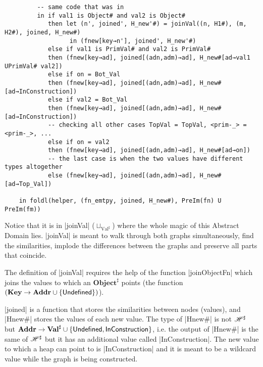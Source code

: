\begin{verbatim}
         -- same code that was in
         in if val1 is Object# and val2 is Object#
            then let (n', joined', H_new'#) = joinVal((n, H1#), (m, H2#), joined, H_new#)
                  in (fnew[key→n'], joined', H_new'#)
            else if val1 is PrimVal# and val2 is PrimVal#
            then (fnew[key→ad], joined[(adn,adm)→ad], H_new#[ad→val1 UPrimVal# val2])
            else if on = Bot_Val
            then (fnew[key→ad], joined[(adn,adm)→ad], H_new#[ad→InConstruction])
            else if val2 = Bot_Val
            then (fnew[key→ad], joined[(adn,adm)→ad], H_new#[ad→InConstruction])
            -- checking all other cases TopVal = TopVal, <prim-_> = <prim-_>, ...
            else if on = val2
            then (fnew[key→ad], joined[(adn,adm)→ad], H_new#[ad→on])
            -- the last case is when the two values have different types altogether
            else (fnew[key→ad], joined[(adn,adm)→ad], H_new#[ad→Top_Val])

    in foldl(helper, (fn_emtpy, joined, H_new#), PreIm(fn) U PreIm(fm))
\end{verbatim}


Notice that it is in \pycode|joinVal| (\(\sqcup_{\text{Val}^\sharp}\)) where the whole
magic of this Abstract Domain lies. \pycode|joinVal| is meant to walk through both graphs
simultaneously, find the similarities, implode the differences between the graphs and
preserve all parts that coincide.

The definition of \pycode|joinVal| requires the help of the function \pycode|joinObjectFn|
which joins the values to which an \(\mathbf{Object}^\sharp\) points (the function
\(\left(\mathbf{Key} \to \mathbf{Addr} \cup \{\mathsf{Undefined}\}\right)\)).

\pycode|joined| is a function that stores the similarities between nodes
(values), and \pycode|Hnew#| stores the values of each new value. The
type of \pycode|Hnew#| is not \(\mathscr{H}^\sharp\) but
\(\mathbf{Addr} \to \mathbf{Val}^\sharp \cup \{\mathsf{Undefined}, \mathsf{InConstruction}\}\), i.e.
the output of \pycode|Hnew#| is the same of \(\mathscr{H}^\sharp\) but it has an additional value
called \pycode|InConstruction|. The new value to which a heap can point to is
\pycode|InConstruction| and it is meant to be a wildcard value while the graph is being
constructed.


